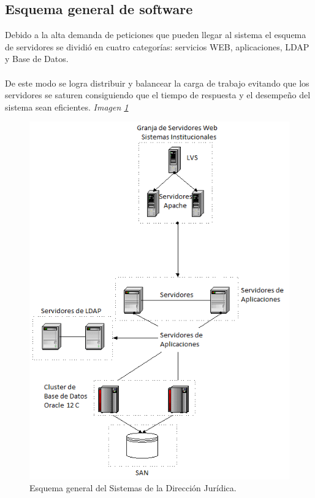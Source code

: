 \documentclass[../reportesINE.tex]{subfiles}
\begin{document}
\subsection{Esquema general de software}
Debido a la alta demanda de peticiones que pueden llegar al sistema el esquema de servidores se dividió en cuatro categorías: servicios WEB, aplicaciones, LDAP y Base de Datos.  \\ \\
De este modo se logra distribuir y balancear la carga de trabajo evitando que los servidores se saturen consiguiendo que el tiempo de respuesta y el desempeño del sistema sean eficientes. \textit{Imagen \ref{fig:esquemaGeneral}}

\begin{figure}[h]
  \centering
  \includegraphics[width=\linewidth]{img/esquemaGeneral.png}
  \caption{Esquema general del Sistemas de la Dirección Jurídica.}
  \label{fig:esquemaGeneral}
\end{figure}
\end{document}
